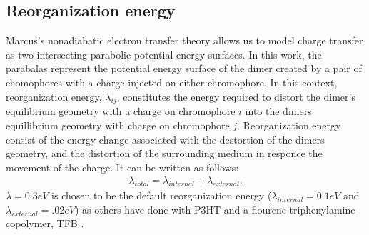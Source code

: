 \subsection{Reorganization energy}

Marcus's nonadiabatic electron transfer theory allows us to model charge transfer as two
intersecting parabolic potential energy surfaces. In this work, the parabalas represent the potential energy surface
of the dimer created by a pair of chomophores with a charge injected on either chromophore. In this context, 
reorganization energy, $\lambda_{ij}$, constitutes the energy required to distort the dimer's equilibrium geometry with a
charge on chromophore $i$ into the dimers equillibrium geometry with charge on chromophore $j$.
Reorganization energy consist of the energy change associated with the destortion of the dimers geometry,
and the distortion of the surrounding medium in responce the movement of the charge. It can be written as
follows:
\begin{align}
    \lambda_{total} = \lambda_{internal} + \lambda_{external}.
\end{align} 
$\lambda = 0.3eV$ is chosen to be the default reorganization energy ($\lambda_{internal} = 0.1eV$
and $\lambda_{external} = .02eV$) as others have done with P3HT \cite{jones2017} and
a flourene-triphenylamine copolymer, TFB \cite{Gali2017}. 

